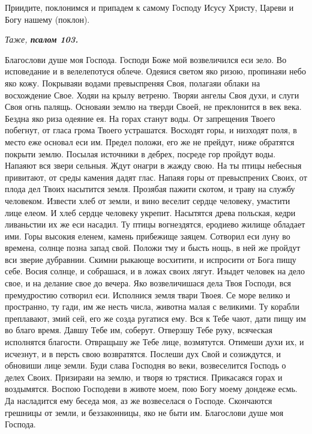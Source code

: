 Приидите, поклонимся и припадем к самому Господу Исусу Христу, Цареви и Богу нашему (поклон).


\medskip


\itshape Таже, \normalfont{}\bfseries псалом 103.\normalfont{}


Благослови душе моя Господа. Господи Боже мой возвеличился еси зело. Во исповедание и в велелепотуся облече. Одеяися светом яко ризою, пропинаяи небо яко кожу. Покрываяи водами превыспреняя Своя, полагаяи облаки на восхождение Свое. Ходяи на крылу ветреню. Творяи ангелы Своя духи, и слуги Своя огнь палящь. Основаяи землю на тверди Своей, не преклонится в век века. Бездна яко риза одеяние ея. На горах станут воды. От запрещения Твоего побегнут, от гласа грома Твоего устрашатся. Восходят горы, и низходят поля, в место еже основал еси им. Предел положи, его же не прейдут, ниже обратятся покрыти землю. Посылая источники в дебрех, посреде гор пройдут воды. Напаяют вся звери сельныя. Ждут онагри  в жажду свою. На ты птицы небесныя привитают, от  среды камения дадят глас. Напаяя горы от превыспрених Своих, от плода дел Твоих насытится земля. Прозябая пажити скотом, и траву на службу человеком. Извести хлеб от земли, и вино веселит сердце человеку, умастити лице елеом. И хлеб сердце человеку укрепит. Насытятся древа польская, кедри ливаньстии их же еси насадил. Ту птицы вогнездятся, еродиево жилище обладает ими. Горы высокия еленем, камень прибежище заяцем. Сотворил еси луну во времена, солнце позна запад свой. Положи тму и бысть нощь, в ней же пройдут вси зверие дубравнии. Скимни рыкающе восхитити, и испросити от Бога пищу себе. Восия солнце, и собрашася, и в ложах своих лягут. Изыдет человек на дело свое, и на делание свое до вечера. Яко возвеличишася дела Твоя Господи, вся премудростию сотворил еси. Исполнися земля твари Твоея. Се море велико и пространно, ту гади, им же несть числа, животна малая с великими. Ту корабли преплавают, змий сей, его же созда ругатися ему. Вся к Тебе чают, дати пищу им во благо время. Давшу Тебе им, соберут. Отверзшу Тебе руку, всяческая исполнятся благости. Отвращьшу же Тебе лице, возмятутся. Отимеши духи их, и исчезнут, и в персть свою возвратятся. Послеши дух Свой и созиждутся, и обновиши лице земли. Буди слава Господня во веки, возвеселится Господь о делех Своих. Призираяи на землю, и творя ю трястися. Прикасаяся горах и воздымятся. Воспою Господеви в животе моем, пою Богу моему дондеже есмь. Да насладится ему беседа моя, аз же возвеселася о Господе. Скончаются грешницы от земли, и беззаконницы, яко не быти им. Благослови душе моя Господа. 


